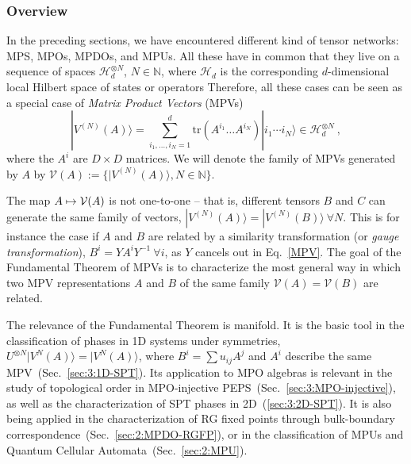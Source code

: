 \documentclass[rmp,aps,reprint,superscriptaddress,nobalancelastpage]{revtex4-1}
\newcommand{\ket}[1]{\vert#1\rangle}
\begin{document}
\subsubsection{Overview}




In the preceding sections, we have encountered different kind of tensor networks: MPS, MPOs, MPDOs, and MPUs.  All these have in common that they live on a sequence of spaces $\mathcal H_d^{\otimes N}$, $N\in\mathbb N$, where $\mathcal H_d$ is the corresponding $d$-dimensional local Hilbert space of states or operators
Therefore, all these cases can be seen as a special case of \emph{Matrix Product Vectors} (MPVs)
\begin{equation}
    \label{MPV}
    |V^{(N)}(A)\rangle = \!\!\!\!\!\sum_{i_1,\ldots,i_N=1}^d\!\! \mathrm{tr}\left( A^{i_1}\ldots  A^{i_N}\right) |i_1\cdots i_N\rangle \in \mathcal H_d^{\otimes N}\ ,
\end{equation}
where the $A^i$ are $D\times D$ matrices. We will denote the family of MPVs generated by $A$ by $\mathcal V(A):=\big\{\ket{V^{(N)}(A)}, N\in\mathbb N\big\}$.

The map $A \mapsto {\cal V}(A)$
is not one-to-one -- that is, different tensors $B$ and $C$ can generate the same family of vectors,  $|V^{(N)}(A)\rangle = |V^{(N)}(B)\rangle\ \forall N$.
This is for instance the case if $A$ and $B$ are related by a similarity transformation (or \emph{gauge transformation}), $B^i=YA^{i}Y^{-1}\
    \forall i$, as $Y$ cancels out in Eq.~\eqref{MPV}.
The goal of the Fundamental Theorem of MPVs is to characterize the most general way in which two MPV representations $A$ and $B$ of the same family $\mathcal V(A)=\mathcal V(B)$ are related.

The relevance of the Fundamental Theorem is manifold. It is the basic tool in
the classification of phases in 1D systems under symmetries, $U^{\otimes N}\ket{V^{N}(A)}=\ket{V^{N}(A)}$, where $B^i=\sum u_{ij}A^j$ and $A^i$ describe the same MPV~(Sec.~\ref{sec:3:1D-SPT}).
Its application to MPO algebras is relevant in the study of topological order in MPO-injective PEPS~(Sec.~\ref{sec:3:MPO-injective}), as well as the characterization of SPT phases in 2D~(\ref{sec:3:2D-SPT}).  It is also being applied in the characterization of RG fixed points through bulk-boundary correspondence~(Sec.~\ref{sec:2:MPDO-RGFP}), or in the classification of MPUs and Quantum Cellular Automata~(Sec.~\ref{sec:2:MPU}).
\end{document}
